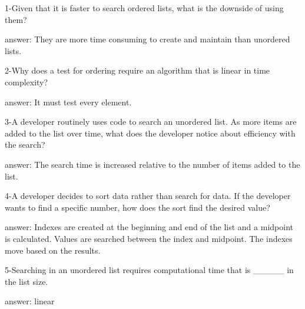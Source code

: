1-Given that it is faster to search ordered lists, what is the downside of using them?

answer: They are more time consuming to create and maintain than unordered lists.

2-Why does a test for ordering require an algorithm that is linear in time complexity?

answer: It must test every element.

3-A developer routinely uses code to search an unordered list.
 As more items are added to the list over time, what does the developer notice about efficiency with the search?

answer: The search time is increased relative to the number of items added to the list.

4-A developer decides to sort data rather than search for data.
 If the developer wants to find a specific number, how does the sort find the desired value?

answer: Indexes are created at the beginning and end of the list and a midpoint is calculated.
 Values are searched between the index and midpoint. The indexes move based on the results.

5-Searching in an unordered list requires computational time that is _____ in the list size.

answer: linear